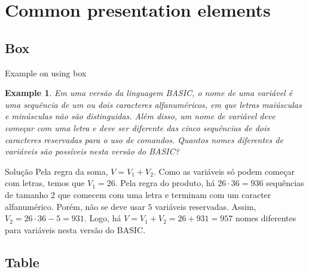 \documentclass[aspectratio=169,t,xcolor=table]{beamer}
\newtheorem{ex}{Example}
\begin{document}
\section{Common presentation elements}

\subsection{Box}

\begin{frame}{Example on using box}

    \footnotesize
    
    \begin{ex}
        Em uma versão da linguagem BASIC, o nome de uma variável é uma sequência de um ou dois caracteres alfanuméricos, em que letras maiúsculas e minúsculas não são distinguidas. Além disso, um nome de variável deve começar com uma letra e deve ser diferente das cinco sequências de dois caracteres reservadas para o uso de comandos. Quantos nomes diferentes de variáveis são possíveis nesta versão do BASIC?
    \end{ex}
    
    \begin{block}{Solução}
        Pela regra da soma, $V=V_1+V_2$. Como as variáveis só podem começar com letras, temos que $V_1=26$. Pela regra do produto, há $26\cdot 36=936$ sequências de tamanho $2$ que comecem com uma letra e terminam com um caracter alfanumérico. Porém, não se deve usar $5$ variáveis reservadas. Assim, $V_2=26\cdot 36-5=931$. Logo, há $V=V_1+V_2 = 26+931=957$ nomes diferentes para variáveis nesta versão do BASIC.
    \end{block}

\end{frame}


\subsection{Table}
\end{document}
